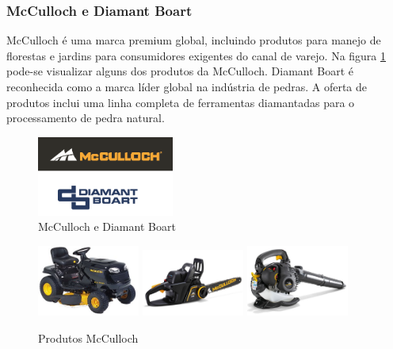 \documentclass[12pt]{article}
\begin{document}
\subsubsection{McCulloch e Diamant Boart}

	McCulloch é uma marca premium global, incluindo produtos para manejo de florestas e jardins para consumidores exigentes do canal de varejo. Na figura \ref{fig:mc-prod} pode-se visualizar alguns dos produtos da McCulloch. 
	Diamant Boart é reconhecida como a marca líder global na indústria de pedras. A oferta de produtos inclui uma linha completa de ferramentas diamantadas para o processamento de pedra natural.

\begin{figure}[h!]
	\centering
	\includegraphics[width=0.4\textwidth]{img/logo-mcdb.png}
	\caption{McCulloch e Diamant Boart}
\end{figure}

\begin{figure}[h!]
	\centering
	\includegraphics[width=0.3\textwidth]{img/products/mc1.jpg}
	\includegraphics[width=0.3\textwidth]{img/products/mc2.jpg}
	\includegraphics[width=0.3\textwidth]{img/products/mc3.jpg}
	\caption{Produtos McCulloch}
	\label{fig:mc-prod}
\end{figure}
\end{document}
